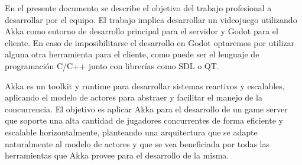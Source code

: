 En el presente documento se describe el objetivo del trabajo profesional a desarrollar 
por el equipo. El trabajo implica desarrollar un videojuego utilizando Akka como entorno 
de desarrollo principal para el servidor y Godot para el cliente. 
En caso de imposibilitarse el desarrollo en Godot optaremos por utilizar alguna otra 
herramienta para el cliente, como puede ser el lenguaje de programación C/C++ junto con
librerías como SDL o QT.

Akka es un toolkit y runtime para desarrollar sistemas reactivos y escalables, 
aplicando el modelo de actores para abstraer y facilitar el manejo de la concurrencia. 
El objetivo es aplicar Akka para el desarrollo de un game server que soporte una alta cantidad 
de jugadores concurrentes de forma eficiente y escalable horizontalmente, 
planteando una arquitectura que se adapte naturalmente al modelo de actores y 
que se vea beneficiada por todas las herramientas que Akka provee para el desarrollo de la misma.

